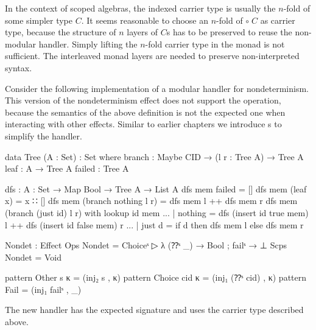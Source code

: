 In the context of scoped algebras, the  indexed carrier type is
usually the $n$-fold of some simpler type $C$.
It seems reasonable to choose an $n$-fold of
\AgdaSpace{}\AgdaSpace{}$\circ\; C$ as
carrier type, because the structure of $n$ layers of $C$s has to be preserved to
reuse the non-modular handler.
Simply lifting the $n$-fold carrier type in the monad is not sufficient.
The interleaved monad layers are needed to preserve non-interpreted syntax.

Consider the following implementation of a modular handler for nondeterminism.
This version of the nondeterminism effect does not support the
 operation, because the semantics of the above definition is
not the expected one when interacting with other effects.
Similar to earlier chapters we introduce s to simplify
the handler.

\begin{code}[hide]
data Tree (A : Set) : Set where
  branch : Maybe CID → (l r : Tree A) → Tree A
  leaf   : A → Tree A
  failed : Tree A

dfs : {A : Set} → Map Bool → Tree A → List A
dfs mem failed                   = []
dfs mem (leaf x)                 = x ∷ []
dfs mem (branch nothing    l r)  = dfs mem l ++ dfs mem r
dfs mem (branch (just id)  l r) with lookup id mem
... | nothing  = dfs (insert id true mem) l ++ dfs (insert id false mem) r
... | just d   = if d then dfs mem l else dfs mem r
\end{code}
\begin{code}
Nondet : Effect
Ops   Nondet = Choiceˢ ▷ λ{ (⁇ˢ _) → Bool ; failˢ → ⊥ }
Scps  Nondet = Void

pattern Other s κ     = (inj₂ s , κ)
pattern Choice cid κ  = (inj₁ (⁇ˢ cid) , κ)
pattern Fail          = (inj₁ failˢ , _)
\end{code}
The new handler has the expected signature and uses the carrier type described
above.

